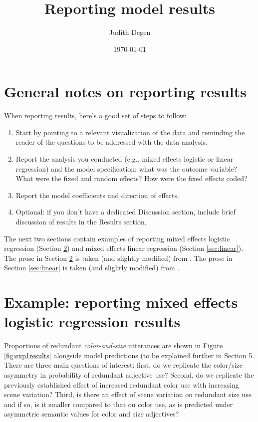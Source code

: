 \documentclass[11pt]{article}
\title{Reporting model results}
\author{Judith Degen}
\date\today
\newcommand{\figref}[1]{Figure \ref{#1}}
\newcommand{\sectionref}[1]{Section \ref{#1}}
\begin{document}
\maketitle

\section{General notes on reporting results}

When reporting results, here's a good set of steps to follow:
\begin{enumerate}
	\item Start by pointing to a relevant visualization of the data and reminding the reader of the questions to be addressed with the data analysis. 
	\item Report the analysis you conducted (e.g., mixed effects logistic or linear regression) and the model specification: what was the outcome variable? What were the fixed and random effects? How were the fixed effects coded?
	\item Report the model coefficients and direction of effects.
	\item Optional: if you don't have a dedicated Discussion section, include brief discussion of results in the Results section.
\end{enumerate}

The next two sections contain examples of reporting mixed effects logistic regression (\sectionref{sec:logistic}) and mixed effects linear regression  (\sectionref{sec:linear}). The prose in \sectionref{sec:logistic} is taken (and slightly modified) from . The prose in \sectionref{sec:linear} is taken (and slightly modified) from .

\newpage

\section{Example: reporting mixed effects logistic regression results}
\label{sec:logistic}

Proportions of redundant \emph{color-and-size} utterances are shown in \figref{fig:exp1results} alongside model predictions (to be explained further in Section 5. There are three main questions of interest: first, do we replicate the color/size asymmetry in probability of redundant adjective use? Second, do we replicate the previously established effect of increased redundant color use with increasing scene variation? Third, is there an effect of scene variation on redundant size use and if so, is it smaller compared to that on color use, as is predicted under asymmetric semantic values for color and size adjectives?
\end{document}
